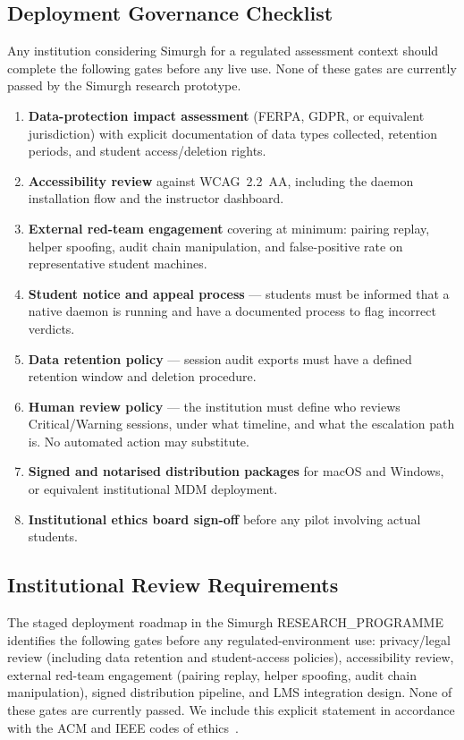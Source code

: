 \documentclass[conference]{IEEEtran}
\begin{document}
\subsection{Deployment Governance Checklist}

Any institution considering Simurgh for a regulated assessment context should complete the following gates before any live use. None of these gates are currently passed by the Simurgh research prototype.

\begin{enumerate}
\item \textbf{Data-protection impact assessment} (FERPA, GDPR, or equivalent jurisdiction) with explicit documentation of data types collected, retention periods, and student access/deletion rights.
\item \textbf{Accessibility review} against WCAG~2.2~AA, including the daemon installation flow and the instructor dashboard.
\item \textbf{External red-team engagement} covering at minimum: pairing replay, helper spoofing, audit chain manipulation, and false-positive rate on representative student machines.
\item \textbf{Student notice and appeal process} — students must be informed that a native daemon is running and have a documented process to flag incorrect verdicts.
\item \textbf{Data retention policy} — session audit exports must have a defined retention window and deletion procedure.
\item \textbf{Human review policy} — the institution must define who reviews Critical/Warning sessions, under what timeline, and what the escalation path is. No automated action may substitute.
\item \textbf{Signed and notarised distribution packages} for macOS and Windows, or equivalent institutional MDM deployment.
\item \textbf{Institutional ethics board sign-off} before any pilot involving actual students.
\end{enumerate}

\subsection{Institutional Review Requirements}

The staged deployment roadmap in the Simurgh RESEARCH\_PROGRAMME identifies the following gates before any regulated-environment use: privacy/legal review (including data retention and student-access policies), accessibility review, external red-team engagement (pairing replay, helper spoofing, audit chain manipulation), signed distribution pipeline, and LMS integration design. None of these gates are currently passed. We include this explicit statement in accordance with the ACM and IEEE codes of ethics~\cite{acm2018code,ieee2024code}.
\end{document}
